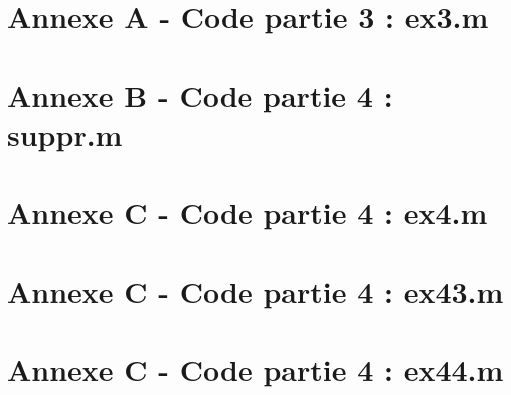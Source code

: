 \documentclass[12pt]{article}
\begin{document}
\newpage
\section*{Annexe A - Code partie 3 : ex3.m}
\label{annexe3}


\newpage
\section*{Annexe B - Code partie 4 : suppr.m}
\label{annexe4-suppr}


\newpage
\section*{Annexe C - Code partie 4 : ex4.m}
\label{annexe4-12}


\newpage
\section*{Annexe C - Code partie 4 : ex43.m}
\label{annexe4-3}


\newpage
\section*{Annexe C - Code partie 4 : ex44.m}
\label{annexe4-3}

\end{document}

